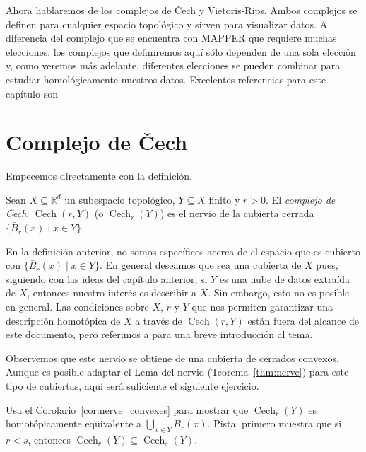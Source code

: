 \documentclass{standalone}
\begin{document}
	Ahora hablaremos de los complejos de \v{C}ech y Vietoris-Rips. Ambos complejos se definen para cualquier espacio topológico y sirven para visualizar datos. A diferencia del complejo que se encuentra con MAPPER que requiere muchas elecciones, los complejos que definiremos aquí sólo dependen de una sola elección y, como veremos más adelante, diferentes elecciones se pueden combinar para estudiar homológicamente nuestros datos. Excelentes referencias para este capítulo son \cite[Capítulo Complexes]{edelsbrunner:2010:computational} \cite[Capítulo 10]{edelsbrunner:2014:computational}
	
	\section{Complejo de \v{C}ech}
	Empecemos directamente con la definición.
	
	\begin{definition}\label{def:cech}
		Sean $X\subseteq\mathbb{R}^{d}$ un subespacio topológico, $Y\subseteq X$ finito y $r>0$. El \emph{complejo de \v{C}ech}, $\operatorname{Cech}(r,Y)$ (o $\operatorname{Cech}_{r}(Y)$) es el nervio de la cubierta cerrada $\{\bar{B}_{r}(x)\mid x\in Y\}$.
	\end{definition}
	
	\begin{remark}
		En la definición anterior, no somos específicos acerca de el espacio que es cubierto con $\{\bar{B}_{r}(x)\mid x\in Y\}$. En general deseamos que sea una cubierta de $X$ pues, siguiendo con las ideas del capítulo anterior, si $Y$ es una nube de datos extraída de $X$, entonces nuestro interés es describir a $X$. Sin embargo, esto no es posible en general. Las condiciones sobre $X$, $r$ y $Y$ que nos permiten garantizar una descripción homotópica de $X$ a través de $\operatorname{Cech}(r,Y)$ están fuera del alcance de este documento, pero referimos a \cite[Section 4.2]{chazal:frontiers} para una breve introducción al tema.
	\end{remark}
	
	Observemos que este nervio se obtiene de una cubierta de cerrados convexos. Aunque es posible adaptar el Lema del nervio (Teorema~\ref{thm:nerve}) para este tipo de cubiertas, aquí será suficiente el siguiente ejercicio.
	
	\begin{exercise}
		Usa el Corolario~\ref{cor:nerve_convexes} para mostrar que $\operatorname{Cech}_{r}(Y)$ es homotópicamente equivalente a $\bigcup_{x\in Y}\bar{B}_{r}(x)$. Pista: primero muestra que si $r<s$, entonces $\operatorname{Cech}_{r}(Y)\subseteq\operatorname{Cech}_{s}(Y)$.
	\end{exercise}
	
\end{document}

